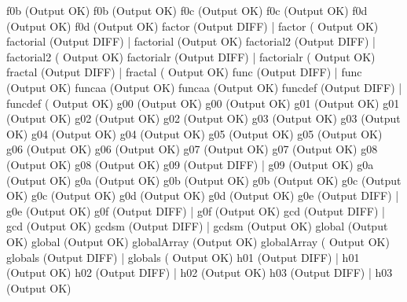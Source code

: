 \documentclass[12pt]{book}
\begin{document}
f0b (Output OK)                                        f0b (Output OK)
f0c (Output OK)                                        f0c (Output OK)
f0d (Output OK)                                        f0d (Output OK)
factor (Output DIFF)                                      |    factor (
Output OK)
factorial (Output DIFF)                                      |    factorial 
(Output OK)
factorial2 (Output DIFF)                                  |    factorial2 (
Output OK)
factorialr (Output DIFF)                                  |    factorialr (
Output OK)
fractal (Output DIFF)                                      |    fractal (
Output OK)
func (Output DIFF)                                      |    func (Output OK)
funcaa (Output OK)                                    funcaa (Output OK)
funcdef (Output DIFF)                                      |    funcdef (
Output OK)
g00 (Output OK)                                        g00 (Output OK)
g01 (Output OK)                                        g01 (Output OK)
g02 (Output OK)                                        g02 (Output OK)
g03 (Output OK)                                        g03 (Output OK)
g04 (Output OK)                                        g04 (Output OK)
g05 (Output OK)                                        g05 (Output OK)
g06 (Output OK)                                        g06 (Output OK)
g07 (Output OK)                                        g07 (Output OK)
g08 (Output OK)                                        g08 (Output OK)
g09 (Output DIFF)                                      |    g09 (Output OK)
g0a (Output OK)                                        g0a (Output OK)
g0b (Output OK)                                        g0b (Output OK)
g0c (Output OK)                                        g0c (Output OK)
g0d (Output OK)                                        g0d (Output OK)
g0e (Output DIFF)                                      |    g0e (Output OK)
g0f (Output DIFF)                                      |    g0f (Output OK)
gcd (Output DIFF)                                      |    gcd (Output OK)
gcdsm (Output DIFF)                                      |    gcdsm (Output 
OK)
global (Output OK)                                    global (Output OK)
globalArray (Output OK)                                    globalArray (
Output OK)
globals (Output DIFF)                                      |    globals (
Output OK)
h01 (Output DIFF)                                      |    h01 (Output OK)
h02 (Output DIFF)                                      |    h02 (Output OK)
h03 (Output DIFF)                                      |    h03 (Output OK)
\end{document}
